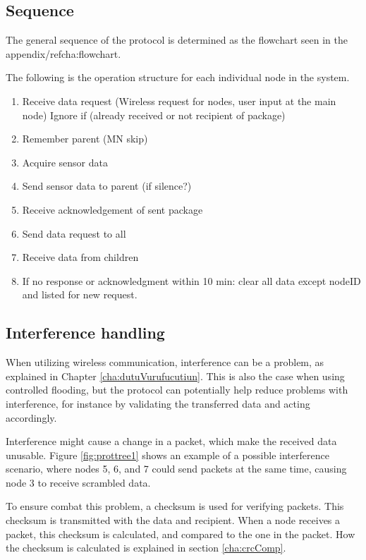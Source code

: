 \subsection{Sequence}
The general sequence of the protocol is determined as the flowchart seen in the appendix/ref{cha:flowchart}.

The following is the operation structure for each individual node in the system.
\begin{enumerate}
	\item Receive data request (Wireless request for nodes, user input at the main node)
	\subitem Ignore if (already received or not recipient of package)
	\item Remember parent (MN skip)
	\item Acquire sensor data
	\item Send sensor data to parent (if silence?)
	\item Receive acknowledgement of sent package
	\item Send data request to all
	\item Receive data from children
	\item If no response or acknowledgment within 10 min: clear all data except nodeID and listed for new request.
\end{enumerate}

\subsection{Interference handling} \label{cha:crcDesign}
When utilizing wireless communication, interference can be a problem, as explained in Chapter \ref{cha:dutuVurufucutiun}. This is also the case when using controlled flooding, but the protocol can potentially help reduce problems with interference, for instance by validating the transferred data and acting accordingly.

Interference might cause a change in a packet, which make the received data unusable. Figure \ref{fig:prottree1} shows an example of a possible interference scenario, where nodes 5, 6, and 7 could send packets at the same time, causing node 3 to receive scrambled data.

To ensure combat this problem, a checksum is used for verifying packets. This checksum is transmitted with the data and recipient. When a node receives a packet, this checksum is calculated, and compared to the one in the packet. How the checksum is calculated is explained in section \ref{cha:crcComp}.

